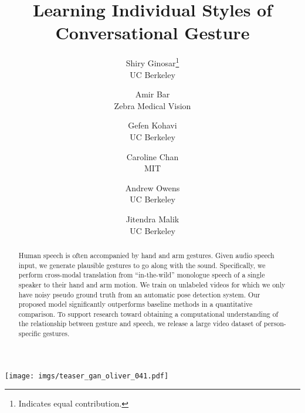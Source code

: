 \documentclass[10pt,twocolumn,letterpaper]{article}
\begin{document}
\title{Learning Individual Styles of Conversational Gesture}

\author{Shiry Ginosar\thanks{Indicates equal contribution.}\\
UC Berkeley\\
\and
Amir Bar\footnotemark[1] \\
Zebra Medical Vision\\
\and
Gefen Kohavi\\
UC Berkeley\\
\and
Caroline Chan\\
MIT \\
\and
\and
Andrew Owens\\
UC Berkeley\\
\and
Jitendra Malik\\
UC Berkeley\\
}

\maketitle


\begin{strip}
\centering
\vspace{-6mm}
\texttt{[image: imgs/teaser\_gan\_oliver\_041.pdf]}
\vspace{-6mm}
\label{fig:teaser}
\end{strip}

\begin{abstract}
Human speech is often accompanied by hand and arm gestures.
Given audio speech input, we generate plausible gestures to go along with the sound.
Specifically, we perform cross-modal translation from ``in-the-wild'' monologue speech of a
single speaker to their hand and arm motion. 
We train on unlabeled videos for which we only have noisy pseudo ground truth from an automatic pose detection system.
Our proposed model significantly outperforms baseline methods in a quantitative comparison.
To support research toward obtaining a computational understanding of the relationship between gesture and speech, we release a large video dataset of person-specific gestures.
\end{abstract}
\end{document}
